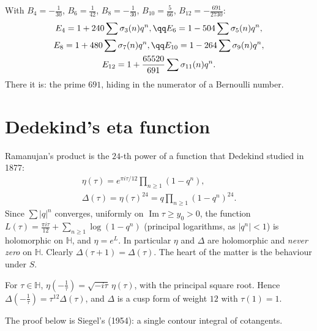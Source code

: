 With $B_4=-\frac1{30}$, $B_6=\frac1{42}$, $B_8=-\frac1{30}$, $B_{10}=\frac5{66}$, $B_{12}=-\frac{691}{2730}$:
\[
\begin{gathered}E_4=1+240\sum\sigma_3(n)q^n,\qq E_6=1-504\sum\sigma_5(n)q^n,\\E_8=1+480\sum\sigma_7(n)q^n,\qq E_{10}=1-264\sum\sigma_9(n)q^n,\\E_{12}=1+\frac{65520}{691}\sum\sigma_{11}(n)q^n.\end{gathered}
\]
There it is: the prime $691$, hiding in the numerator of a Bernoulli number.

\section{Dedekind's eta function}

Ramanujan's product is the $24$-th power of a function that Dedekind studied in 1877:
\[
\begin{gathered}\eta(\tau)=e^{\pi i\tau/12}\prod_{n\ge1}(1-q^n),\\\Delta(\tau)=\eta(\tau)^{24}=q\prod_{n\ge1}(1-q^n)^{24}.\end{gathered}
\]
Since $\sum|q|^n$ converges, uniformly on $\operatorname{Im}\tau\ge y_0>0$, the function $L(\tau)=\frac{\pi i\tau}{12}+\sum_{n\ge1}\log(1-q^n)$ (principal logarithms, as $|q^n|<1$) is holomorphic on $\mathbb H$, and $\eta=e^L$. In particular $\eta$ and
$\Delta$ are holomorphic and \emph{never zero} on $\mathbb H$. Clearly $\Delta(\tau+1)=\Delta(\tau)$. The heart of the matter is the behaviour under $S$.

\begin{theorem}[Dedekind]\label{thm:eta}
For $\tau\in\mathbb H$, $\eta(-\frac1\tau)=\sqrt{-i\tau}\,\eta(\tau)$, with the principal square root. Hence $\Delta(-\frac1\tau)=\tau^{12}\Delta(\tau)$, and $\Delta$ is a cusp form of weight $12$ with $\tau(1)=1$.
\end{theorem}

The proof below is Siegel's (1954): a single contour integral of cotangents.

